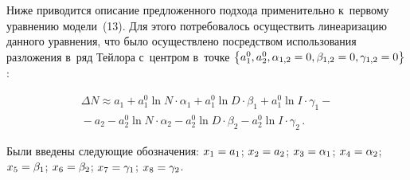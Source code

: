 \begin{multicols}{2}
  Ниже приводится описание предложенного подхода применительно к~первому уравнению модели~(13). Для этого потребовалось осуществить
линеаризацию данного уравнения, что было осуществлено посредством
использования разложения в~ряд Тейлора с~центром в~точке $\left\{ a_1^0,
a_2^0, \alpha_{1,2}\hm=0, \beta_{1,2}\hm=0, \gamma_{1,2}\hm=0\right\}$:

\vspace*{-3pt}

\noindent
  \begin{multline}
  \Delta N\approx a_1+a_1^0 \ln N\cdot \alpha_1 +a_1^0 \ln D\cdot \beta_1 +a_1^0
\ln I\cdot \gamma_1-{}\\
  {}- a_2 -a_2^0 \ln N\cdot \alpha_2 -a_2^0 \ln D\cdot \beta_2-a_2^0 \ln I\cdot
\gamma_2\,.
  \label{e15-spi}
  \end{multline}




  Были введены следующие обозначения: $x_1\hm= a_1$; $x_2\hm= a_2$;
$x_3\hm=\alpha_1$; $x_4\hm= \alpha_2$; $x_5\hm= \beta_1$; $x_6\hm= \beta_2$;
$x_7\hm= \gamma_1$; $x_8\hm= \gamma_2$.


\end{multicols}
